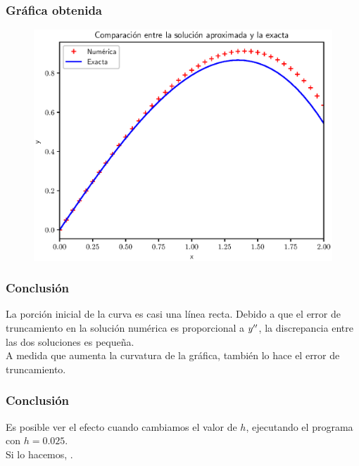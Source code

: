 \documentclass[12pt]{beamer}
\begin{document}
\begin{frame}
\frametitle{Gráfica obtenida}
\begin{figure}
	\centering
	\includegraphics[scale=0.55]{Imagenes/plot_euler_ejercicio_02.eps}
\end{figure}
\end{frame}
\begin{frame}
\frametitle{Conclusión}
La porción inicial de la curva es casi una línea recta. \pause Debido a que el error de truncamiento en la solución numérica es proporcional a ${y}^{\prime \prime}$, \pause la discrepancia entre las dos soluciones es pequeña.
\\
\bigskip
\pause
A medida que aumenta la curvatura de la gráfica, también lo hace el error de truncamiento.
\end{frame}
\begin{frame}
\frametitle{Conclusión}
Es posible ver el efecto cuando cambiamos el valor de $h$, \pause ejecutando el programa con $h = 0.025$.
\\
\bigskip
\pause
Si lo hacemos, \pause {}.
\end{frame}
\end{document}
